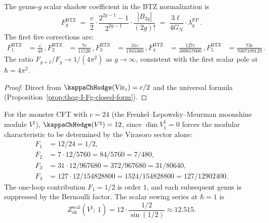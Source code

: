 \begin{proposition}
\label{prop:thqg-I-btz-higher-genus}
The genus-$g$ scalar shadow coefficient in the BTZ normalization is
\begin{equation}%
F_g^{\mathrm{BTZ}} \;=\; \frac{c}{2} \cdot \frac{2^{2g-1}-1}{2^{2g-1}} \cdot \frac{|B_{2g}|}{(2g)!} \;=\; \frac{3\ell}{4G_N} \cdot \lambda_g^{\mathrm{FP}}\,.
\end{equation}
The first five corrections are:
\begin{align}
F_1^{\mathrm{BTZ}} &= \frac{c}{48}\,, %
F_2^{\mathrm{BTZ}} &= \frac{7c}{11520}\,, %
F_3^{\mathrm{BTZ}} &= \frac{31c}{1935360}\,, %
F_4^{\mathrm{BTZ}} &= \frac{127c}{309657600}\,, %
F_5^{\mathrm{BTZ}} &= \frac{73c}{7007109120}\,. %
\end{align}
The ratio $F_{g+1}/F_g \to 1/(4\pi^2)$ as $g \to \infty$, consistent with the first scalar pole at $\hbar = 4\pi^2$.
\end{proposition}

\begin{proof}
Direct from $\kappaChHodge(\mathrm{Vir}_c) = c/2$ and the universal formula (Proposition~\ref{prop:thqg-I-Fg-closed-form}).
\end{proof}

\begin{remark}[Numerical values for $c = 24$ (monster CFT)]
For the monster CFT with $c = 24$ (the Frenkel--Lepowsky--Meurman moonshine module $V^\natural$), $\kappaChHodge(V^\natural) = 12$, since $\dim V_1^\natural = 0$ forces the modular characteristic to be determined by the Virasoro sector alone:
\begin{align*}
F_1 &= 12/24 = 1/2, \\
F_2 &= 7 \cdot 12/5760 = 84/5760 = 7/480, \\
F_3 &= 31 \cdot 12/967680 = 372/967680 = 31/80640, \\
F_4 &= 127 \cdot 12/154828800 = 1524/154828800 = 127/12902400.
\end{align*}
The one-loop contribution $F_1 = 1/2$ is order $1$, and each
subsequent genus is suppressed by the Bernoulli factor. The scalar
sewing series at $\hbar = 1$ is
\[
Z_{\mathrm{sh}}^{\mathrm{scal}}(V^\natural;\,1)
= 12 \cdot \frac{1/2}{\sin(1/2)}
\approx 12.515.
\]
\end{remark}


